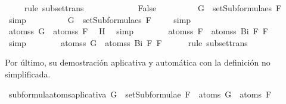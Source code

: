 \begin{isabellebody}
\ {}\ {}\ \isamarkupfalse%
\ {\isacharparenleft}rule\ subset{\isacharunderscore}trans{\isacharparenright}\isanewline
\ \ \ \ \isamarkupfalse%
\isanewline
\ \ \ \ \ \ \isamarkupfalse%
\ False\isanewline
\ \ \ \ \ \ \isamarkupfalse%
\ \isamarkupfalse%
\ {\isachardoublequoteopen}G\ {\isasymnotin}\ setSubformulae{\isacharunderscore}s\ F{}{\isachardoublequoteclose}\ \isamarkupfalse%
\ simp\isanewline
\ \ \ \ \ \ \isamarkupfalse%
\ \isamarkupfalse%
\ {\isachardoublequoteopen}G\ {\isasymin}\ setSubformulae{\isacharunderscore}s\ F{}{\isachardoublequoteclose}\ \isamarkupfalse%
\ {}\ \isamarkupfalse%
\ simp\isanewline
\ \ \ \ \ \ \isamarkupfalse%
\ \isamarkupfalse%
\ {}{\isacharcolon}{\isachardoublequoteopen}atoms{\isacharunderscore}s\ G\ {\isasymsubseteq}\ atoms{\isacharunderscore}s\ F{}{\isachardoublequoteclose}\ \isamarkupfalse%
\ H{}\ \isamarkupfalse%
\ simp\isanewline
\ \ \ \ \ \ \isamarkupfalse%
\ {}{\isacharcolon}{\isachardoublequoteopen}atoms{\isacharunderscore}s\ F{}\ {\isasymsubseteq}\ atoms{\isacharunderscore}s\ {\isacharparenleft}Bi\ F{}\ F{}{\isacharparenright}{\isachardoublequoteclose}\ \isamarkupfalse%
\ {}\ \isamarkupfalse%
\ simp\isanewline
\ \ \ \ \ \ \isamarkupfalse%
\ {\isachardoublequoteopen}atoms{\isacharunderscore}s\ G\ {\isasymsubseteq}\ atoms{\isacharunderscore}s\ {\isacharparenleft}Bi\ F{}\ F{}{\isacharparenright}{\isachardoublequoteclose}\ \isamarkupfalse%
\ {}\ {}\ \isamarkupfalse%
\ {\isacharparenleft}rule\ subset{\isacharunderscore}trans{\isacharparenright}\isanewline
\ \ \ \ \isamarkupfalse%
\isanewline
\ \ \isamarkupfalse%
\isanewline
{}\isamarkupfalse%
%
\endisatagproof
{\isafoldproof}%
%
\isadelimproof
%
\endisadelimproof
%
\begin{isamarkuptext}%
Por último, su demostración aplicativa y automática con la definición no simplificada.%
\end{isamarkuptext}\isamarkuptrue%
\isamarkupfalse%
\ subformula{\isacharunderscore}atoms{\isacharunderscore}aplicativa{\isacharcolon}\ {\isachardoublequoteopen}G\ {\isasymin}\ setSubformulae\ F\ {\isasymLongrightarrow}\ atoms\ G\ {\isasymsubseteq}\ atoms\ F{\isachardoublequoteclose}\isanewline

\end{isabellebody}
